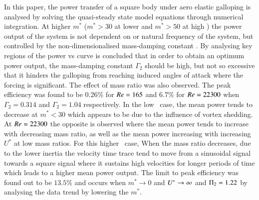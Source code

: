In this paper, the power transfer of a square body under aero elastic galloping is analysed by solving the quasi-steady state model equations through numerical integration. At higher $m^*$ ($m^*>30$ at lower \reynoldsnumber and $m^*> 50$ at high \reynoldsnumber) the power output of the system is not dependent on \ustar or natural frequency of the system, but controlled by the non-dimensionalised mass-damping constant \massdamp . By analysing key regions of the power vs \ustar curve is concluded that in order to obtain an optimum power output, the mass-damping constant $\Gamma_2$ should be high, but not so excessive that it hinders the galloping from reaching induced angles of attack where the forcing is significant. The effect of mass ratio was also observed. The peak efficiency was found to be $0.26\%$ for $Re=165$ and $6.7\%$ for $Re=22300$  when $\Gamma_2=0.314$ and $\Gamma_2=1.04$ respectively. In the low \reynoldsnumber\ case, the mean power tends to decrease at $m^*<30$ which appears to be due to the influence of vortex shedding. At $Re=22300$ the opposite is observed where the mean power tends to increase with decreasing mass ratio, as well as the mean power increasing with increasing $U^*$ at low mass ratios. For this higher \reynoldsnumber\ case, When the mass ratio decreases, due to the lower inertia the velocity time trace tend to move from a sinusoidal signal towards a square signal where it sustains high velocities for longer periods of time which leads to a higher mean power output. The limit to peak efficiency was found out to be $13.5\%$ and occurs when $m^*\rightarrow 0$ and $U^{*} \rightarrow \infty$ and $\Pi_2=1.22$ by analysing the data trend by lowering the $m^*$.

